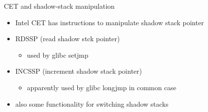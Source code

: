 \begin{frame}{CET and shadow-stack manipulation}
    \begin{itemize}
    \item Intel CET has instructions to manipulate shadow stack pointer
    \item RDSSP (read shadow stck pointer)
        \begin{itemize}
        \item used by glibc setjmp
        \end{itemize}
    \item INCSSP (increment shadow stack pointer)
        \begin{itemize}
        \item apparently used by glibc longjmp in common case
        \end{itemize}
    \vspace{.5cm}
    \item also some functionality for switching shadow stacks
    \end{itemize}
\end{frame}

